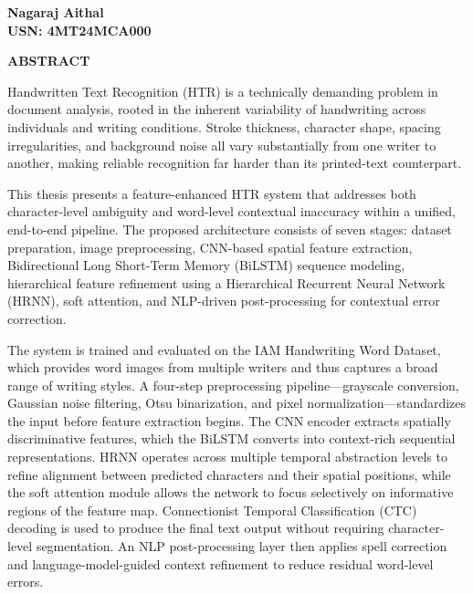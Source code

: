 \vspace{2cm}
\begin{flushright}
    \textbf{Nagaraj Aithal} \\
    \textbf{USN: 4MT24MCA000}
\end{flushright}

\newpage

\begin{center}
    \Large{\textbf{ABSTRACT}} \\
    \vspace{1.0cm}
\end{center}
Handwritten Text Recognition (HTR) is a technically demanding problem in document analysis, rooted in the inherent variability of handwriting across individuals and writing conditions. Stroke thickness, character shape, spacing irregularities, and background noise all vary substantially from one writer to another, making reliable recognition far harder than its printed-text counterpart.

This thesis presents a feature-enhanced HTR system that addresses both character-level ambiguity and word-level contextual inaccuracy within a unified, end-to-end pipeline. The proposed architecture consists of seven stages: dataset preparation, image preprocessing, CNN-based spatial feature extraction, Bidirectional Long Short-Term Memory (BiLSTM) sequence modeling, hierarchical feature refinement using a Hierarchical Recurrent Neural Network (HRNN), soft attention, and NLP-driven post-processing for contextual error correction.

The system is trained and evaluated on the IAM Handwriting Word Dataset, which provides word images from multiple writers and thus captures a broad range of writing styles. A four-step preprocessing pipeline---grayscale conversion, Gaussian noise filtering, Otsu binarization, and pixel normalization---standardizes the input before feature extraction begins. The CNN encoder extracts spatially discriminative features, which the BiLSTM converts into context-rich sequential representations. HRNN operates across multiple temporal abstraction levels to refine alignment between predicted characters and their spatial positions, while the soft attention module allows the network to focus selectively on informative regions of the feature map. Connectionist Temporal Classification (CTC) decoding is used to produce the final text output without requiring character-level segmentation. An NLP post-processing layer then applies spell correction and language-model-guided context refinement to reduce residual word-level errors.

